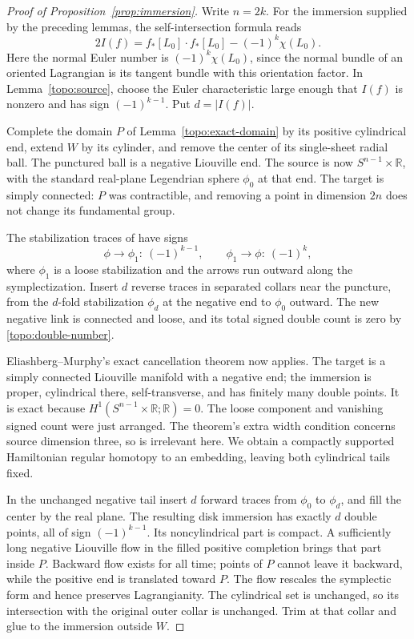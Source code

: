 \documentclass[11pt]{article}
\numberwithin{equation}{section}
\theoremstyle{definition}
\theoremstyle{remark}
\begin{document}
\begin{proof}[Proof of Proposition~\ref{prop:immersion}]
Write $n=2k$.  For the immersion supplied by the preceding lemmas,
the self-intersection formula reads
\begin{equation}\label{topo:double-number}
 2I(f)=f_*[L_0]\cdot f_*[L_0]-(-1)^k\chi(L_0).
\end{equation}
Here the normal Euler number is $(-1)^k\chi(L_0)$, since the
normal bundle of an oriented Lagrangian is its tangent bundle
with this orientation factor.  In Lemma~\ref{topo:source}, choose
the Euler characteristic large enough that $I(f)$ is nonzero
and has sign $(-1)^{k-1}$.  Put $d=|I(f)|$.

Complete the domain $P$ of Lemma~\ref{topo:exact-domain} by its
positive cylindrical end, extend $W$ by its cylinder, and remove
the center of its single-sheet radial ball.  The punctured ball
is a negative Liouville end.  The source is now
$S^{n-1}\times\mathbb R$, with the standard real-plane Legendrian
sphere $\phi_0$ at that end.  The target is simply connected:
$P$ was contractible, and removing a point in dimension $2n$
does not change its fundamental group.

The stabilization traces of
\cite[Lemma~3.2 and proof of Lemma~3.4]{EEMS} have signs
\begin{equation}\label{topo:trace-signs}
 \phi\longrightarrow\phi_1:\ (-1)^{k-1},
 \qquad
 \phi_1\longrightarrow\phi:\ (-1)^k,
\end{equation}
where $\phi_1$ is a loose stabilization and the arrows run
outward along the symplectization.  Insert $d$ reverse traces
in separated collars near the puncture, from the $d$-fold
stabilization $\phi_d$ at the negative end to $\phi_0$ outward.
The new negative link is connected and loose, and its total
signed double count is zero by \eqref{topo:double-number}.

Eliashberg--Murphy's exact cancellation theorem
\cite[Theorem~2.3]{EliashbergMurphyCaps} now applies.  The target
is a simply connected Liouville manifold with a negative end;
the immersion is proper, cylindrical there, self-transverse,
and has finitely many double points.  It is exact because
$H^1(S^{n-1}\times\mathbb R;\mathbb R)=0$.  The loose component and vanishing
signed count were just arranged.  The theorem's extra width
condition concerns source dimension three, so is irrelevant
here.  We obtain a compactly supported Hamiltonian regular
homotopy to an embedding, leaving both cylindrical tails fixed.

In the unchanged negative tail insert $d$ forward traces from
$\phi_0$ to $\phi_d$, and fill the center by the real plane.
The resulting disk immersion has exactly $d$ double points,
all of sign $(-1)^{k-1}$.  Its noncylindrical part is compact.
A sufficiently long negative Liouville flow in the filled
positive completion brings that part inside $P$.  Backward
flow exists for all time; points of $P$ cannot leave it
backward, while the positive end is translated toward $P$.
The flow rescales the symplectic form and hence preserves
Lagrangianity.  The cylindrical set is unchanged, so its
intersection with the original outer collar is unchanged.
Trim at that collar and glue to the immersion outside $W$.


\end{proof}
\end{document}
